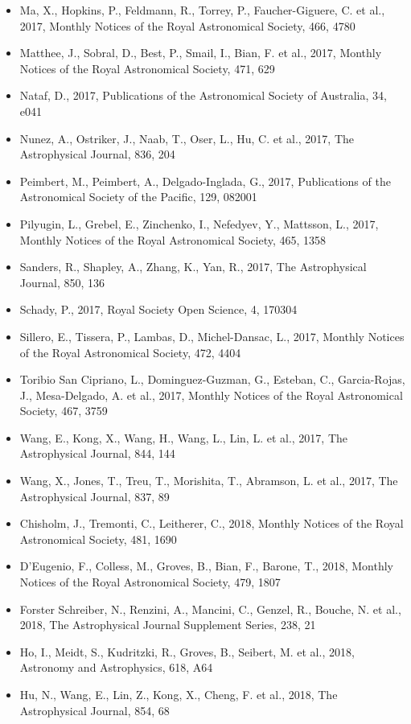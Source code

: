 \documentclass{letter}
\begin{document}
\begin{enumerate}
\begin{itemize}
\item Ma, X., Hopkins, P., Feldmann, R., Torrey, P., Faucher-Giguere, C. et al., 2017, Monthly Notices of the Royal Astronomical Society, 466, 4780
\item Matthee, J., Sobral, D., Best, P., Smail, I., Bian, F. et al., 2017, Monthly Notices of the Royal Astronomical Society, 471, 629
\item Nataf, D., 2017, Publications of the Astronomical Society of Australia, 34, e041
\item Nunez, A., Ostriker, J., Naab, T., Oser, L., Hu, C. et al., 2017, The Astrophysical Journal, 836, 204
\item Peimbert, M., Peimbert, A., Delgado-Inglada, G., 2017, Publications of the Astronomical Society of the Pacific, 129, 082001
\item Pilyugin, L., Grebel, E., Zinchenko, I., Nefedyev, Y., Mattsson, L., 2017, Monthly Notices of the Royal Astronomical Society, 465, 1358
\item Sanders, R., Shapley, A., Zhang, K., Yan, R., 2017, The Astrophysical Journal, 850, 136
\item Schady, P., 2017, Royal Society Open Science, 4, 170304
\item Sillero, E., Tissera, P., Lambas, D., Michel-Dansac, L., 2017, Monthly Notices of the Royal Astronomical Society, 472, 4404
\item Toribio San Cipriano, L., Dominguez-Guzman, G., Esteban, C., Garcia-Rojas, J., Mesa-Delgado, A. et al., 2017, Monthly Notices of the Royal Astronomical Society, 467, 3759
\item Wang, E., Kong, X., Wang, H., Wang, L., Lin, L. et al., 2017, The Astrophysical Journal, 844, 144
\item Wang, X., Jones, T., Treu, T., Morishita, T., Abramson, L. et al., 2017, The Astrophysical Journal, 837, 89
\item Chisholm, J., Tremonti, C., Leitherer, C., 2018, Monthly Notices of the Royal Astronomical Society, 481, 1690
\item D'Eugenio, F., Colless, M., Groves, B., Bian, F., Barone, T., 2018, Monthly Notices of the Royal Astronomical Society, 479, 1807
\item Forster Schreiber, N., Renzini, A., Mancini, C., Genzel, R., Bouche, N. et al., 2018, The Astrophysical Journal Supplement Series, 238, 21
\item Ho, I., Meidt, S., Kudritzki, R., Groves, B., Seibert, M. et al., 2018, Astronomy and Astrophysics, 618, A64
\item Hu, N., Wang, E., Lin, Z., Kong, X., Cheng, F. et al., 2018, The Astrophysical Journal, 854, 68

\end{itemize}
\end{enumerate}
\end{document}
